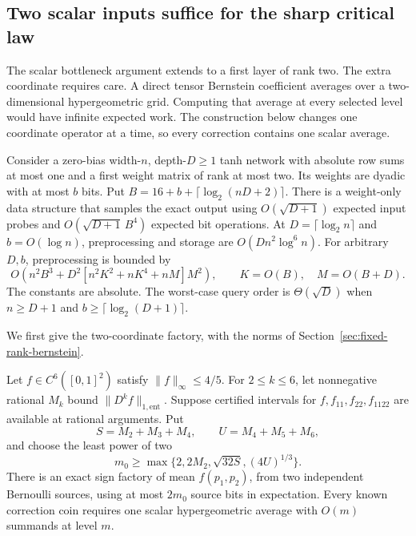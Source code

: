 \subsection{Two scalar inputs suffice for the sharp critical law}
\label{sec:rank-two-critical}

The scalar bottleneck argument extends to a first layer of rank two.
The extra coordinate requires care. A direct tensor Bernstein
coefficient averages over a two-dimensional hypergeometric grid.
Computing that average at every selected level would have infinite
expected work. The construction below changes one coordinate operator
at a time, so every correction contains one scalar average.

\begin{theorem}
\label{thm:rank-two-critical}
Consider a zero-bias width-$n$, depth-$D\ge1$ tanh network with
absolute row sums at most one and a first weight matrix of rank at
most two. Its weights are dyadic with at most $b$ bits. Put
$B=16+b+\lceil\log_2(nD+2)\rceil$.
There is a weight-only data structure that samples the exact output
using $O(\sqrt{D+1})$ expected input probes and
$O(\sqrt{D+1}\,B^4)$ expected bit operations. At
$D=\lceil\log_2n\rceil$ and $b=O(\log n)$, preprocessing and
storage are $O(Dn^2\log^6n)$.
For arbitrary $D,b$, preprocessing is bounded by
\[
 O\!\left(n^2B^3+D^2[n^2K^2+nK^4+nM]M^2\right),
 \qquad K=O(B),\quad M=O(B+D).
\]
The constants are absolute. The worst-case query order is
$\Theta(\sqrt D)$ when $n\ge D+1$ and
$b\ge\lceil\log_2(D+1)\rceil$.
\end{theorem}

We first give the two-coordinate factory, with the norms of
Section~\ref{sec:fixed-rank-bernstein}.

\begin{lemma}
\label{lem:rank-two-bernstein}
Let $f\in C^6([0,1]^2)$ satisfy $\|f\|_\infty\le4/5$.
For $2\le k\le6$, let nonnegative rational $M_k$ bound
$\|D^kf\|_{1,\mathrm{ent}}$. Suppose certified intervals for
$f,f_{11},f_{22},f_{1122}$ are available at rational arguments.
Put
\[
 S=M_2+M_3+M_4,\qquad U=M_4+M_5+M_6,
\]
and choose the least power of two
\[
 m_0\ge\max\{2,2M_2,\sqrt{32S},(4U)^{1/3}\}.
\]
There is an exact sign factory of mean $f(p_1,p_2)$, from two
independent Bernoulli sources, using at most $2m_0$ source bits
in expectation. Every known correction coin requires one scalar
hypergeometric average with $O(m)$ summands at level $m$.
\end{lemma}

